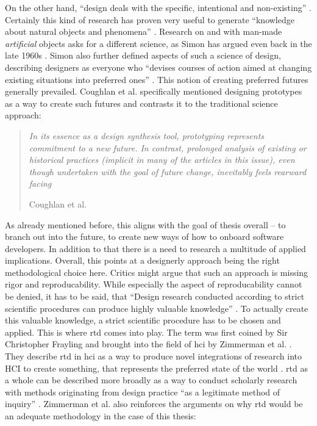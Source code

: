 On the other hand, \enquote{design deals with the specific, intentional and non-existing} \cite[p. 59]{stolterman2008nature}. Certainly this kind of research has proven very useful to generate \enquote{knowledge about natural objects and phenomena} \cite[p. 3]{simon2019sciences}. Research on and with man-made \textit{artificial} objects asks for a different science, as Simon has argued even back in the late 1960s \cite{simon2019sciences}. Simon also further defined aspects of such a science of design, describing designers as everyone who \enquote{devises courses of action aimed at changing existing situations into preferred ones} \cite[p. 111]{simon2019sciences}. This notion of creating preferred futures generally prevailed. Coughlan et al. specifically mentioned designing prototypes as a way to create such futures and contrasts it to the traditional science approach:

\begin{quote}
  \textit{In its essence as a design synthesis tool, prototyping represents commitment to a new future. In contrast, prolonged analysis of existing or historical practices (implicit in many of the articles in this issue), even though undertaken with the goal of future change, inevitably feels rearward facing}

  \footnotesize{Coughlan et al. \cite[p. 132]{coughlan2007prototypes}}
\end{quote}

As already mentioned before, this aligns with the goal of thesis overall -- to branch out into the future, to create new ways of how to onboard software developers. In addition to that there is a need to research a multitude of applied implications. Overall, this points at a designerly approach being the right methodological choice here. Critics might argue that such an approach is missing rigor and reproducability. While especially the aspect of reproducability cannot be denied, it has to be said, that \enquote{Design research conducted according to strict scientific procedures can produce highly valuable knowledge} \cite[p. 60]{stolterman2008nature}. To actually create this valuable knowledge, a strict scientific procedure has to be chosen and applied. This is where \gls{rtd} comes into play. The term was first coined by Sir Christopher Frayling \cite{frayling1994research} and brought into the field of \gls{hci} by Zimmerman et al. \cite{zimmerman2007research}. They describe \gls{rtd} in \gls{hci} as a way to produce novel integrations of research into HCI to create something, that represents the preferred state of the world \cite[p. 493]{zimmerman2007research}. \gls{rtd} as a whole can be described more broadly as a way to conduct scholarly research with methods originating from design practice \cite{zimmerman2014research} \enquote{as a legitimate method of inquiry} \cite[p. 310]{zimmerman2010analysis}. Zimmerman et al. also reinforces the arguments on why \gls{rtd} would be an adequate methodology in the case of this thesis:

